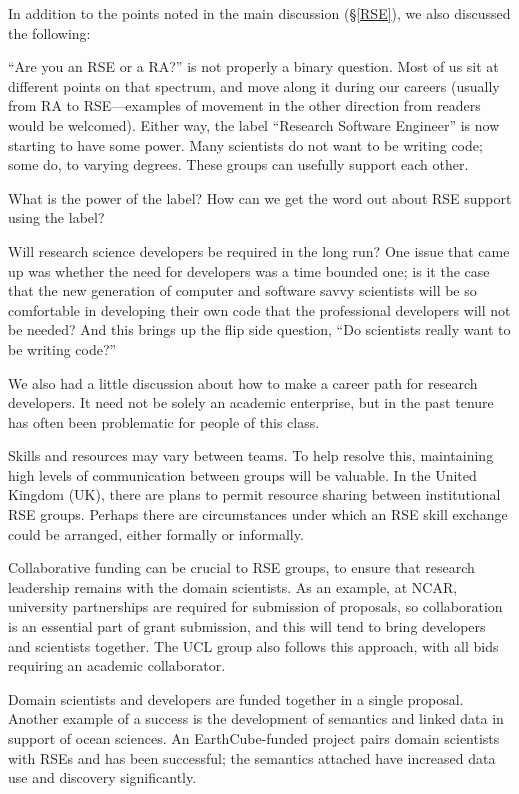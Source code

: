 In addition to the points noted in the main discussion (\S\ref{RSE}), we also
discussed the following:

``Are you an RSE or a RA?'' is not properly a binary question. Most of us sit at
different points on that spectrum, and move along it during our careers (usually
from RA to RSE---examples of movement in the other direction from readers would
be welcomed). Either way, the label ``Research Software Engineer'' is now
starting to have some power. Many scientists do not want to be writing code;
some do, to varying degrees. These groups can usefully support each other.

What is the power of the label? How can we get the word out about RSE support
using the label?

Will research science developers be required in the long run? One issue that
came up was whether the need for developers was a time bounded one; is it the
case that the new generation of computer and software savvy scientists will be
so comfortable in developing their own code that the professional developers
will not be needed? And this brings up the flip side question, ``Do scientists
really want to be writing code?''

We also had a little discussion about how to make a career path for research
developers. It need not be solely an academic enterprise, but in the past tenure
has often been problematic for people of this class.

Skills and resources may vary between teams. To help resolve this, maintaining
high levels of communication between groups will be valuable. In the United
Kingdom (UK), there are plans to permit resource sharing between institutional
RSE groups. Perhaps there are circumstances under which an RSE skill exchange
could be arranged, either formally or informally.

Collaborative funding can be crucial to RSE groups, to ensure that research
leadership remains with the domain scientists. As an example, at NCAR, university partnerships
are required for submission of proposals, so collaboration is an essential part
of grant submission, and this will tend to bring developers and scientists
together. The UCL group also follows this approach, with all bids requiring an
academic collaborator.

Domain scientists and developers are funded together in a single proposal.
Another example of a success is the development of semantics and linked data in
support of ocean sciences. An EarthCube-funded project pairs domain scientists
with RSEs and has been successful; the semantics attached have increased data
use and discovery significantly.

